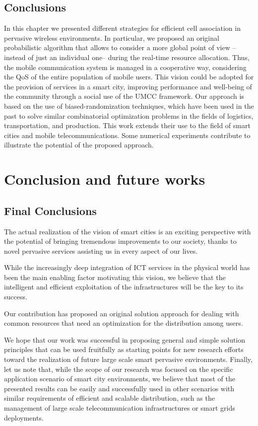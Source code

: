 \documentclass[twoside,openright]{report}
\begin{document}
\section{Conclusions}
\label{sec:conclusion}
In this chapter we presented different strategies for efficient cell association in pervasive wireless environments. 
In particular, we proposed an original probabilistic algorithm that allows to consider a more global point of view --instead of just an individual one-- during the real-time resource allocation. 
Thus, the mobile communication system is managed in a cooperative way, considering the \gls{QoS} of the entire population of mobile users. This vision could be adopted for the provision of services in a smart city, improving performance and well-being of the community through a social use of the \gls{UMCC} framework. 
Our approach is based on the use of biased-randomization techniques, which have been used in the past to solve similar combinatorial optimization problems in the fields of logistics, transportation, and production. 
This work extends their use to the field of smart cities and mobile telecommunications. 
Some numerical experiments contribute to illustrate the potential of the proposed approach.

\chapter{Conclusion and future works}
\section{Final Conclusions}
The actual realization of the vision of smart cities is an exciting perspective with the potential of bringing tremendous improvements to our society, thanks to novel pervasive services assisting us in every aspect of our lives.

While the increasingly deep integration of \gls{ICT} services in the physical world has been the main enabling factor motivating this vision, we believe that the intelligent and efficient exploitation of the infrastructures will be the key to its success.

Our contribution has proposed an original solution approach for dealing with common resources that need an optimization for the distribution among users. 

We hope that our work was successful in proposing general and simple solution principles that can be used fruitfully as starting points for new research efforts toward the realization of future large scale smart pervasive environments. 
Finally, let us note that, while the scope of our research was focused on the specific application scenario of smart city environments, we believe that most of the presented results can be easily and successfully used in other scenarios with similar requirements of efficient and scalable distribution, such as the management of large scale telecommunication infrastructures or smart grids deployments.
\end{document}
